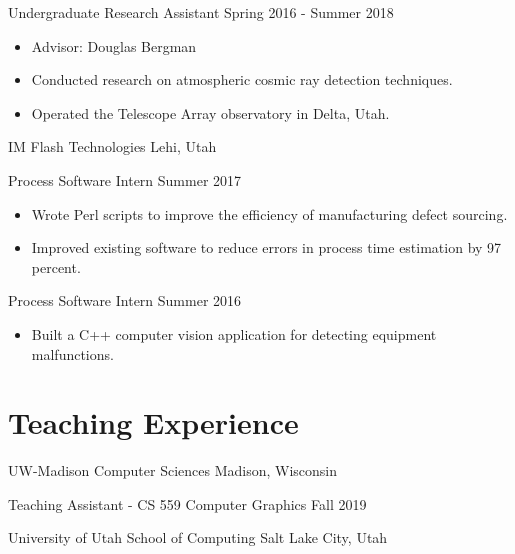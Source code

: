 \begin{tab2} Undergraduate Research Assistant \> Spring 2016 - Summer 2018 \end{tab2}
\begin{itemize}
    \item Advisor: Douglas Bergman
    \item Conducted research on atmospheric cosmic ray detection techniques.
    \item Operated the Telescope Array observatory in Delta, Utah.
\end{itemize}

\blockskip

\begin{tab1} IM Flash Technologies \> Lehi, Utah \end{tab1}

\begin{tab2} Process Software Intern \> Summer 2017 \end{tab2}
\begin{itemize}
    \item Wrote Perl scripts to improve the efficiency of manufacturing defect sourcing.
    \item Improved existing software to reduce errors in process time estimation by 97 percent.
\end{itemize}

\begin{tab2} Process Software Intern \> Summer 2016 \end{tab2}
\begin{itemize}
    \item Built a C++ computer vision application for detecting equipment malfunctions.
\end{itemize}


\section*{Teaching Experience}

\begin{tab1} UW-Madison Computer Sciences \> Madison, Wisconsin \end{tab1}

\begin{tab2} Teaching Assistant - CS 559 Computer Graphics \> Fall 2019 \end{tab2}

\blockskip

\begin{tab1} University of Utah School of Computing \> Salt Lake City, Utah \end{tab1}

